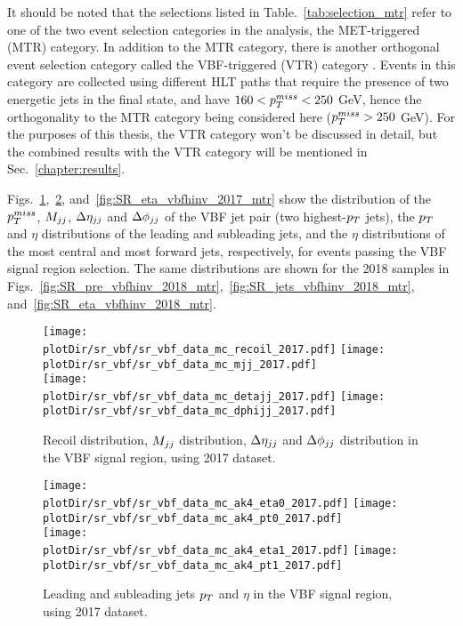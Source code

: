 It should be noted that the selections listed in Table.~\ref{tab:selection_mtr} refer to one of the two event selection categories in the analysis,
the MET-triggered (MTR) category. In addition to the MTR category, there is another orthogonal event selection category called the 
VBF-triggered (VTR) category \cite{VBFHinvAnalysisPaper}.
Events in this category are collected using different HLT paths that require the presence of two energetic jets in the final state, and have 
$160 < p_T^{miss} < 250$ GeV, hence the orthogonality to the MTR category being considered here ($p_T^{miss} > 250$ GeV). 
For the purposes of this thesis, the VTR category won't be discussed in detail, but the combined
results with the VTR category will be mentioned in Sec.~\ref{chapter:results}. 

Figs.~\ref{fig:SR_pre_vbfhinv_2017_mtr},~\ref{fig:SR_jets_vbfhinv_2017_mtr}, and~\ref{fig:SR_eta_vbfhinv_2017_mtr} 
show the distribution of the $p_T^{miss}$, $M_{jj}$, $\Delta \eta_{jj}$ and $\Delta \phi_{jj}$ of the VBF jet pair (two highest-$p_T$ jets), the $p_T$ and $\eta$ distributions 
of the leading and subleading jets, and the $\eta$ distributions of the most central and most forward jets, respectively, for events
passing the VBF signal region selection.
The same distributions are shown for the 2018 samples in Figs.~\ref{fig:SR_pre_vbfhinv_2018_mtr},~\ref{fig:SR_jets_vbfhinv_2018_mtr},
and~\ref{fig:SR_eta_vbfhinv_2018_mtr}.

\begin{figure}[htbp]
    \begin{center}
        \texttt{[image: \\plotDir/sr\_vbf/sr\_vbf\_data\_mc\_recoil\_2017.pdf]}
        \texttt{[image: \\plotDir/sr\_vbf/sr\_vbf\_data\_mc\_mjj\_2017.pdf]} \\
        \texttt{[image: \\plotDir/sr\_vbf/sr\_vbf\_data\_mc\_detajj\_2017.pdf]}
        \texttt{[image: \\plotDir/sr\_vbf/sr\_vbf\_data\_mc\_dphijj\_2017.pdf]}
        
    \end{center}
    \caption{Recoil distribution, $M_{jj}$ distribution, $\Delta \eta_{jj}$ and $\Delta \phi_{jj}$
    distribution in the VBF signal region, using 2017 dataset.}
    \label{fig:SR_pre_vbfhinv_2017_mtr}
\end{figure}

\begin{figure}[htbp]
    \begin{center}
        \texttt{[image: \\plotDir/sr\_vbf/sr\_vbf\_data\_mc\_ak4\_eta0\_2017.pdf]}
        \texttt{[image: \\plotDir/sr\_vbf/sr\_vbf\_data\_mc\_ak4\_pt0\_2017.pdf]} \\
        \texttt{[image: \\plotDir/sr\_vbf/sr\_vbf\_data\_mc\_ak4\_eta1\_2017.pdf]}
        \texttt{[image: \\plotDir/sr\_vbf/sr\_vbf\_data\_mc\_ak4\_pt1\_2017.pdf]}
    \end{center}
    \caption{Leading and subleading jets $p_T$ and $\eta$ in the VBF signal region, using 2017 dataset.}
    \label{fig:SR_jets_vbfhinv_2017_mtr}
\end{figure}

